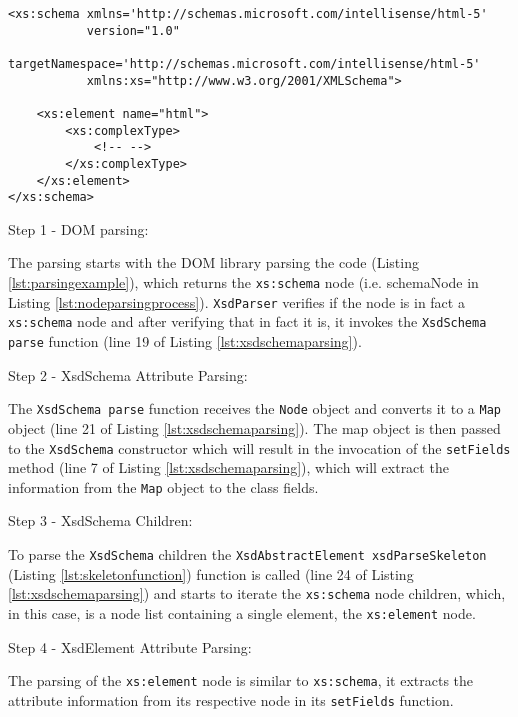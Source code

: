 \begin{minipage}{\linewidth}
\begin{lstlisting}[caption={Parsing Concrete Example},captionpos=b,label={lst:parsingexample}]
<xs:schema xmlns='http://schemas.microsoft.com/intellisense/html-5'
           version="1.0"
           targetNamespace='http://schemas.microsoft.com/intellisense/html-5'
           xmlns:xs="http://www.w3.org/2001/XMLSchema">

    <xs:element name="html">
        <xs:complexType>
            <!-- -->
        </xs:complexType>
    </xs:element>
</xs:schema>
\end{lstlisting}
\end{minipage}


Step 1 - DOM parsing:

\noindent
The parsing starts with the \ac{DOM} library parsing the code (Listing \ref{lst:parsingexample}), which returns the \texttt{xs:schema} node (i.e. schemaNode in Listing \ref{lst:nodeparsingprocess}). \texttt{XsdParser} verifies if the node is in fact a \texttt{xs:schema} node and after verifying that in fact it is, it invokes the \texttt{XsdSchema parse} function (line 19 of Listing \ref{lst:xsdschemaparsing}). 

Step 2 - XsdSchema Attribute Parsing:

\noindent
The \texttt{XsdSchema parse} function receives the \texttt{Node} object and converts it to a \texttt{Map} object (line 21 of Listing \ref{lst:xsdschemaparsing}). The map object is then passed to the \texttt{XsdSchema} constructor which will result in the invocation of the \texttt{setFields} method (line 7 of Listing \ref{lst:xsdschemaparsing}), which will extract the information from the \texttt{Map} object to the class fields.

Step 3 - XsdSchema Children:

\noindent
To parse the \texttt{XsdSchema} children the \texttt{XsdAbstractElement xsdParseSkeleton} (Listing \ref{lst:skeletonfunction}) function is called (line 24 of Listing \ref{lst:xsdschemaparsing}) and starts to iterate the \texttt{xs:schema} node children, which, in this case, is a node list containing a single element, the \texttt{xs:element} node. 

Step 4 - XsdElement Attribute Parsing:

\noindent
The parsing of the \texttt{xs:element} node is similar to \texttt{xs:schema}, it extracts the attribute information from its respective node in its \texttt{setFields} function. 

